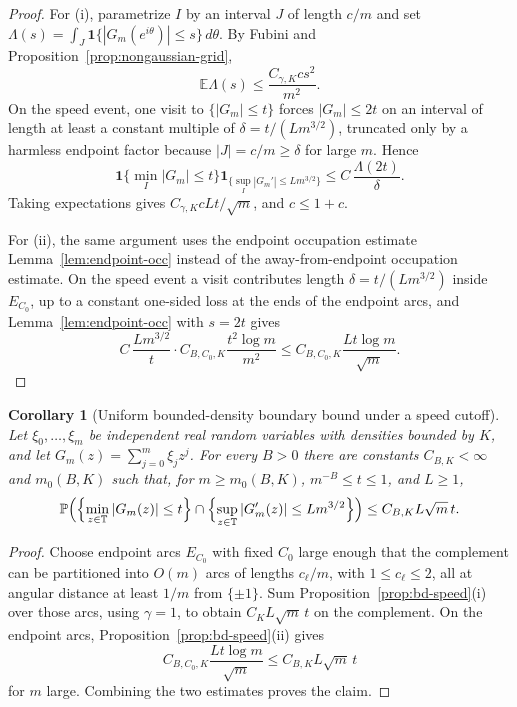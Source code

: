 \documentclass[11pt]{amsart}
\numberwithin{equation}{section}
\newtheorem{corollary}[theorem]{Corollary}
\theoremstyle{definition}
\theoremstyle{remark}
\newcommand{\T}{\mathbb T}
\newcommand{\Prob}{\mathbb P}
\newcommand{\Exp}{\mathbb E}
\newcommand{\abs}[1]{\left\lvert #1\right\rvert}
\begin{document}
\begin{proof}
For (i), parametrize \(I\) by an interval \(J\) of length \(c/m\) and set
\(\Lambda(s)=\int_J\mathbf1\{\abs{G_m(e^{i\theta})}\le s\}\,d\theta\).  By
Fubini and Proposition~\ref{prop:nongaussian-grid},
\[
  \Exp\Lambda(s)\le \frac{C_{\gamma,K}c s^2}{m^2}.
\]
On the speed event, one visit to \(\{\abs{G_m}\le t\}\) forces
\(\abs{G_m}\le2t\) on an interval of length at least a constant multiple of
\(\delta=t/(Lm^{3/2})\), truncated only by a harmless endpoint factor because
\(\abs J=c/m\ge\delta\) for large \(m\).  Hence
\[
  \mathbf1\{\min_I\abs{G_m}\le t\}\mathbf1_{\{\sup_I\abs{G_m'}\le Lm^{3/2}\}}
  \le C\,\frac{\Lambda(2t)}{\delta}.
\]
Taking expectations gives \(C_{\gamma,K}cLt/\sqrt m\), and \(c\le1+c\).

For (ii), the same argument uses the endpoint occupation estimate
Lemma~\ref{lem:endpoint-occ} instead of the away-from-endpoint occupation
estimate.  On the speed event a visit contributes length
\(\delta=t/(Lm^{3/2})\) inside \(E_{C_0}\), up to a constant one-sided loss at
the ends of the endpoint arcs, and Lemma~\ref{lem:endpoint-occ} with \(s=2t\)
gives
\[
  C\,\frac{Lm^{3/2}}{t}\cdot
  C_{B,C_0,K}\frac{t^2\log m}{m^2}
  \le C_{B,C_0,K}\frac{Lt\log m}{\sqrt m}.
\]
\end{proof}

\begin{corollary}[Uniform bounded-density boundary bound under a speed cutoff]
\label{cor:bd-uniform-speed}
Let \(\xi_0,\ldots,\xi_m\) be independent real random variables with densities
bounded by \(K\), and let \(G_m(z)=\sum_{j=0}^m\xi_jz^j\).  For every
\(B>0\) there are constants \(C_{B,K}<\infty\) and \(m_0(B,K)\) such that, for
\(m\ge m_0(B,K)\), \(m^{-B}\le t\le1\), and \(L\ge1\),
\[
  \Prob\Bigl(
    \Bigl\{\min_{z\in\T}\abs{G_m(z)}\le t\Bigr\}
    \cap
    \Bigl\{\sup_{z\in\T}\abs{G_m'(z)}\le Lm^{3/2}\Bigr\}
  \Bigr)
  \le C_{B,K}L\sqrt m\,t .
\]
\end{corollary}

\begin{proof}
Choose endpoint arcs \(E_{C_0}\) with fixed \(C_0\) large enough that the
complement can be partitioned into \(O(m)\) arcs of lengths \(c_\ell/m\), with
\(1\le c_\ell\le2\), all at angular distance at least \(1/m\) from
\(\{\pm1\}\).  Sum Proposition~\ref{prop:bd-speed}(i) over those arcs, using
\(\gamma=1\), to obtain \(C_KL\sqrt m\,t\) on the complement.  On the endpoint
arcs, Proposition~\ref{prop:bd-speed}(ii) gives
\[
  C_{B,C_0,K}\frac{Lt\log m}{\sqrt m}\le C_{B,K}L\sqrt m\,t
\]
for \(m\) large.  Combining the two estimates proves the claim.
\end{proof}
\end{document}
